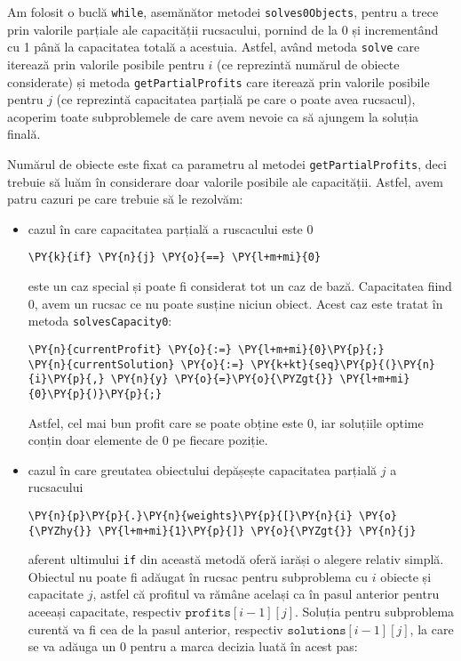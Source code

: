 \begin{sloppypar}
    Am folosit o buclă \texttt{while}, asemănător metodei \texttt{solves0Objects}, pentru a trece prin valorile parțiale ale capacității rucsacului, pornind de la 0 și incrementând cu 1 până la capacitatea totală a acestuia. Astfel, având metoda \texttt{solve} care iterează prin valorile posibile pentru $i$ (ce reprezintă numărul de obiecte considerate) și metoda \texttt{getPartialProfits} care iterează prin valorile posibile pentru $j$ (ce reprezintă capacitatea parțială pe care o poate avea rucsacul), acoperim toate subproblemele de care avem nevoie ca să ajungem la soluția finală. \par
    Numărul de obiecte este fixat ca parametru al metodei \texttt{getPartialProfits}, deci trebuie să luăm în considerare doar valorile posibile ale capacității. Astfel, avem patru cazuri pe care trebuie să le rezolvăm:
    \begin{itemize}
        \item cazul în care capacitatea parțială a ruscacului este 0
        \begin{Verbatim}[commandchars=\\\{\}]
                        \PY{k}{if} \PY{n}{j} \PY{o}{==} \PY{l+m+mi}{0}
\end{Verbatim}
        este un caz special și poate fi considerat tot un caz de bază. Capacitatea fiind 0, avem un rucsac ce nu poate susține niciun obiect. Acest caz este tratat în metoda \texttt{solvesCapacity0}:
        \begin{Verbatim}[commandchars=\\\{\}]
\PY{n}{currentProfit} \PY{o}{:=} \PY{l+m+mi}{0}\PY{p}{;}
\PY{n}{currentSolution} \PY{o}{:=} \PY{k+kt}{seq}\PY{p}{(}\PY{n}{i}\PY{p}{,} \PY{n}{y} \PY{o}{=}\PY{o}{\PYZgt{}} \PY{l+m+mi}{0}\PY{p}{)}\PY{p}{;}
\end{Verbatim}
        Astfel, cel mai bun profit care se poate obține este 0, iar soluțiile optime conțin doar elemente de 0 pe fiecare poziție.
        \item cazul în care greutatea obiectului depășește capacitatea parțială $j$ a rucsacului
        \begin{Verbatim}[commandchars=\\\{\}]
                    \PY{n}{p}\PY{p}{.}\PY{n}{weights}\PY{p}{[}\PY{n}{i} \PY{o}{\PYZhy{}} \PY{l+m+mi}{1}\PY{p}{]} \PY{o}{\PYZgt{}} \PY{n}{j}
\end{Verbatim}
        aferent ultimului \texttt{if} din această metodă oferă iarăși o alegere relativ simplă. Obiectul nu poate fi adăugat în rucsac pentru subproblema cu $i$ obiecte și capacitate $j$, astfel că profitul va rămâne același ca în pasul anterior pentru aceeași capacitate, respectiv $\texttt{profits}[i - 1][j]$. Soluția pentru subproblema curentă va fi cea de la pasul anterior, respectiv $\texttt{solutions}[i - 1][j]$, la care se va adăuga un 0 pentru a marca decizia luată în acest pas:

\end{itemize}
\end{sloppypar}

